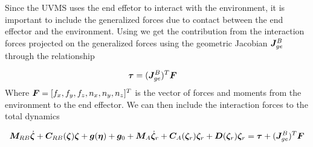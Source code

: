 Since the UVMS uses the end effetor to interact with the environment, it is important to include the generalized forces due to contact between the end effector and the environment. Using \cite{spong2005robot} we get the contribution from the interaction forces projected on the generalized forces using the geometric Jacobian $\boldsymbol J_{ge}^B$ through the relationship

\begin{align}
  \boldsymbol \tau&= (\boldsymbol J_{ge}^B)^T \boldsymbol F 
  \label{eq:jacobian_force}
\end{align}
Where $\boldsymbol F= [f_x, f_y, f_z, n_x, n_y,n_z]^T  $ is the vector of forces and moments from the environment to the end effector. We can then include the interaction forces to the total dynamics
{\small
\begin{mdframed}[style=graybox]
\begin{align}
  \boldsymbol M_{RB}\dot{\boldsymbol \zeta}+ \boldsymbol C_{RB}(\boldsymbol \zeta)\boldsymbol \zeta + \boldsymbol g(\boldsymbol \eta) + \boldsymbol g_0 + \boldsymbol M_A \dot{\boldsymbol \zeta}_r  + \boldsymbol C_A(\boldsymbol \zeta_r) \boldsymbol \zeta_r + \boldsymbol D(\boldsymbol \zeta_r) \boldsymbol \zeta_r =\boldsymbol \tau+ (\boldsymbol J_{ge}^B)^T \boldsymbol F 
\label{eq:dyn_with_current}
\end{align}
\end{mdframed}
}


























